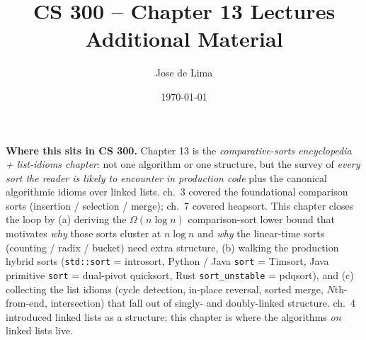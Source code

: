 \documentclass[11pt]{article}
\title{CS 300 -- Chapter 13 Lectures\\\large Additional Material}
\author{Jose de Lima}
\date{\today}
\begin{document}
\maketitle

\begin{ideabox}
\textbf{Where this sits in CS 300.} Chapter 13 is the
\emph{comparative-sorts encyclopedia + list-idioms chapter}: not one
algorithm or one structure, but the survey of \emph{every sort the
reader is likely to encounter in production code} plus the canonical
algorithmic idioms over linked lists. ch.~3 covered the foundational
comparison sorts (insertion / selection / merge); ch.~7 covered
heapsort. This chapter closes the loop by (a) deriving the
$\Omega(n \log n)$ comparison-sort lower bound that motivates
\emph{why} those sorts cluster at $n \log n$ and \emph{why} the
linear-time sorts (counting / radix / bucket) need extra structure,
(b) walking the production hybrid sorts (\texttt{std::sort} =
introsort, Python / Java \texttt{sort} = Timsort, Java primitive
\texttt{sort} = dual-pivot quicksort, Rust \texttt{sort\_unstable}
= pdqsort), and (c) collecting the list idioms (cycle detection,
in-place reversal, sorted merge, $N$th-from-end, intersection) that
fall out of singly- and doubly-linked structure. ch.~4 introduced
linked lists as a structure; this chapter is where the algorithms
\emph{on} linked lists live.


\end{ideabox}
\end{document}
